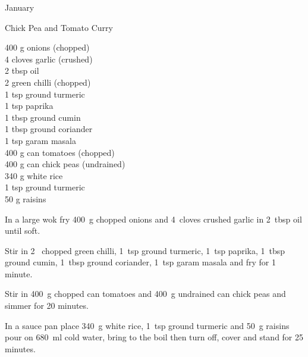 \begin{menu}{January}
    \begin{recipe}{2}{Chick Pea and Tomato Curry}%
		\begin{ingredients}
		400 g onions (chopped) \\
	4 cloves garlic (crushed) \\
	2 tbsp oil  \\
	2  green chilli (chopped) \\
	1 tsp ground turmeric  \\
	1 tsp paprika  \\
	1 tbsp ground cumin  \\
	1 tbsp ground coriander  \\
	1 tsp garam masala  \\
	400 g can tomatoes (chopped) \\
	400 g can chick peas (undrained) \\
	340 g white rice  \\
	1 tsp ground turmeric  \\
	50 g raisins  \\
	
		\end{ingredients}
	
	
	
    \begin{instructions}
    \item 
        In a large wok fry
        400~g chopped onions
        and
        4~cloves crushed garlic
        in
        2~tbsp  oil
        until soft.
      \item 
        Stir in
        2~ chopped green chilli,
        1~tsp  ground turmeric,
        1~tsp  paprika,
        1~tbsp  ground cumin,
        1~tbsp  ground coriander,
        1~tsp  garam masala
        and fry for 1 minute.
      \item 
        Stir in
        400~g chopped can tomatoes
        and
        400~g undrained can chick peas
        and simmer for 20 minutes.
      \item 
    In a
    sauce pan
    place
    340~g  white rice,
    1~tsp  ground turmeric
    and
    50~g  raisins
    pour on
    680~ml  cold water,
    bring to the boil then turn off, cover and stand for 25 minutes.
  
    \end{instructions}
    \end{recipe}%
  

\end{menu}
